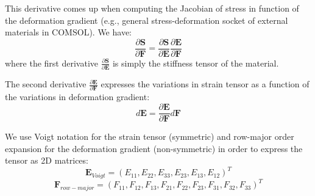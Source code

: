 \documentclass[letterpaper,12pt,oneside]{report}
\begin{document}
This derivative comes up when computing the Jacobian of stress in function of the deformation gradient (e.g., general stress-deformation socket of external materials in COMSOL). We have:
\begin{equation}
\frac{\partial \mathbf{S}}{\partial \mathbf{F}} = \frac{\partial \mathbf{S}}{\partial \mathbf{E}} \frac{\partial \mathbf{E}}{\partial \mathbf{F}}
\end{equation}
where the first derivative $\frac{\partial \mathbf{S}}{\partial \mathbf{E}}$ is simply the stiffness tensor of the material.

The second derivative $\frac{\partial \mathbf{E}}{\partial \mathbf{F}}$ expresses the variations in strain tensor as a function of the variations in deformation gradient:
\begin{equation}
d\mathbf{E} = \frac{\partial \mathbf{E}}{\partial \mathbf{F}} d\mathbf{F}
\end{equation}

We use Voigt notation for the strain tensor (symmetric) and row-major order expansion for the deformation gradient (non-symmetric) in order to express the tensor as 2D matrices:
\begin{equation}
\mathbf{E}_{Voigt} = (E_{11},E_{22},E_{33},E_{23},E_{13},E_{12})^T
\end{equation}
\begin{equation}
\mathbf{F}_{row-major} = (F_{11},F_{12},F_{13},F_{21},F_{22},F_{23},F_{31},F_{32},F_{33})^T
\end{equation}
\end{document}
